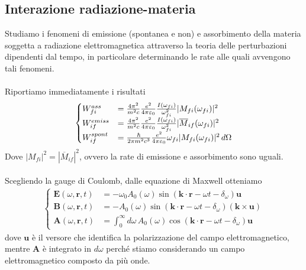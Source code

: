 \documentclass{article}
\begin{document}
\newpage
\subsection{Interazione radiazione-materia}
Studiamo i fenomeni di emissione (spontanea e non) e assorbimento della materia soggetta a radiazione elettromagnetica attraverso la teoria delle perturbazioni dipendenti dal tempo, in particolare determinando le rate alle quali avvengono tali fenomeni. \\ \\
Riportiamo immediatamente i risultati
\begin{align}
    \begin{cases}
        W^{ass}_{fi} &= \frac{4\pi^2}{m^2c}\frac{e^2}{4\pi\varepsilon_0}\frac{I(\omega_{fi})}{\omega^2_{fi}}|M_{fi}(\omega_{fi})|^2 \\
        W^{emiss}_{if} &= \frac{4\pi^2}{m^2c}\frac{e^2}{4\pi\varepsilon_0}\frac{I(\omega_{fi})}{\omega^2_{fi}}|\overline{M}_{if}(\omega_{fi})|^2 \\
        W^{spont}_{if} &= \frac{\hbar}{2\pi m^2c^3}\frac{e^2}{4\pi\varepsilon_0}\omega_{fi}|M_{fi}(\omega_{fi})|^2 \, d\Omega
    \end{cases} \notag
\end{align}
Dove $|M_{fi}|^2 = |\overline{M}_{if}|^2$, ovvero la rate di emissione e assorbimento sono uguali. \\ \\
Scegliendo la gauge di Coulomb, dalle equazione di Maxwell otteniamo 
\begin{align}
    \begin{cases}
        \mathbf{E}(\omega, \mathbf{r}, t) &= -\omega_0A_0(\omega)\sin(\mathbf{k} \cdot \mathbf{r} - \omega t - \delta_\omega)\mathbf{u} \\
        \mathbf{B}(\omega, \mathbf{r}, t) &= -A_0(\omega)\sin(\mathbf{k} \cdot \mathbf{r} - \omega t - \delta_\omega)(\mathbf{k} \times \mathbf{u}) \\
        \mathbf{A}(\omega, \mathbf{r}, t) &= \int_0^\infty d\omega \, A_0(\omega)\cos(\mathbf{k} \cdot \mathbf{r} - \omega t -\delta_\omega)\mathbf{u}
    \end{cases} \tag{1.3.1}
\end{align}
dove $\mathbf{u}$ è il versore che identifica la polarizzazione del campo elettromagnetico, mentre $\mathbf{A}$ è integrato in $d\omega$ perché stiamo considerando un campo elettromagnetico composto da più onde. \\ \\
\end{document}
